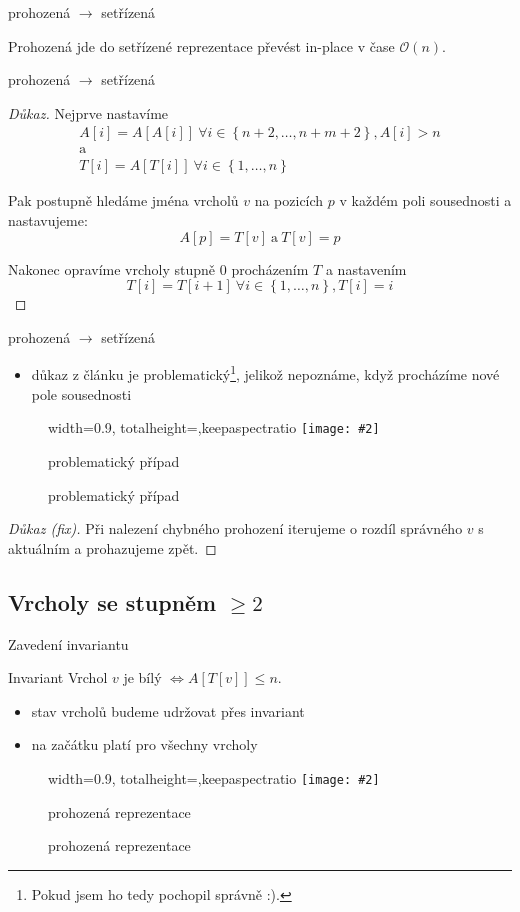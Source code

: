 \documentclass[czech]{beamer}
\makeatletter
\newcommand{\fitimage}[2][\@nil]{
	\begin{figure}
		\begin{adjustbox}{width=0.9\textwidth, totalheight=\textheight-2\baselineskip-2\baselineskip,keepaspectratio}
			\texttt{[image: \#2]}
		\end{adjustbox}
		\def\tmp{#1}%
	 \ifx\tmp\@nnil
			\else
			\caption{#1}
		\fi
	\end{figure}
}
\makeatother
\begin{document}
	\begin{frame}{prohozená $\rightarrow$ setřízená}
		\begin{lemma}
			Prohozená jde do setřízené reprezentace převést in-place v čase $\mathcal{O}\left(n\right)$.
		\end{lemma}
	\end{frame}

	\begin{frame}{prohozená $\rightarrow$ setřízená}
		\begin{proof}[Důkaz]
			\small
			Nejprve nastavíme 
			\begin{gather*}
				A[i] = A[A[i]]\ \forall i \in \left\{n + 2, \ldots, n + m + 2\right\}, A[i] > n \\
				\text{a} \\
				T[i] = A[T[i]]\ \forall i \in \left\{1, \ldots, n\right\}
			\end{gather*}

			Pak postupně hledáme jména vrcholů $v$ na pozicích $p$ v každém poli sousednosti a nastavujeme:
			$$A[p] = T[v]\ \text{a}\ T\left[v\right] = p$$

			Nakonec opravíme vrcholy stupně $0$ procházením $T$ a nastavením
			$$T[i] = T[i + 1]\ \forall i \in \left\{1, \ldots, n\right\}, T[i] = i$$
		\end{proof}
	\end{frame}

	\begin{frame}{prohozená $\rightarrow$ setřízená}
	\begin{itemize}
			\item důkaz z článku je problematický\footnote{Pokud jsem ho tedy pochopil správně :).}, jelikož nepoznáme, když procházíme nové pole sousednosti
		\end{itemize}
		\fitimage[problematický případ]{images/sorted-pointer-problem.png}
		\begin{proof}[Důkaz (fix)]
			Při nalezení chybného prohození iterujeme o rozdíl správného $v$ s aktuálním a prohazujeme zpět.
		\end{proof}
	\end{frame}

	\subsection{Vrcholy se stupněm $\ge 2$}

	\begin{frame}{Zavedení invariantu}
		\begin{block}{Invariant}
			Vrchol $v$ je bílý $\iff A[T[v]] \le n$.
		\end{block}
		\begin{itemize}
			\item stav vrcholů budeme udržovat přes invariant
			\item na začátku platí pro všechny vrcholy
		\end{itemize}
		\vfill
		\fitimage[prohozená reprezentace]{images/swapped.png}
	\end{frame}
\end{document}
